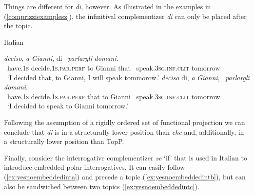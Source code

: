 \noindent Things are different for \textit{di}, however. As illustrated in the examples in (\ref{comprizziexamplesz}), the infinitival complementizer \textit{di} can only be placed after the topic. 

\begin{exe}
\ex Italian \citep[205]{rizzi2013notes} \label{comprizziexamplesz}\begin{xlist} 
\ex {} {\textit{deciso},} {\textit{a}} {\textit{Gianni},} {di} {\textcolor{white}{*}\textit{parlargli}} {\textit{domani}.} \\
{\textcolor{white}{*}have.\textsc{1s}} {decide.\textsc{1s.par.perf}} {to} {Gianni} {that} {\textcolor{white}{*}speak.\textsc{3sg.inf}.\textsc{clit}} {tomorrow} \\
\trans \textcolor{white}{*}`I decided that, to Gianni, I will speak tommorow.' \label{ex:comprizziabz}
\ex {} {\textit{deciso}} {di,} {\textit{a}} {\textit{Gianni},} {\textcolor{white}{*}\textit{parlargli}} {\textit{domani}.} \\
{\textcolor{white}{*}have.\textsc{1s}} {decide.\textsc{1s.par.perf}} {that} {to} {Gianni} {\textcolor{white}{*}speak.\textsc{3sg.inf}.\textsc{clit}} {tomorrow} \\
\trans \textcolor{white}{*}`I decided to speak to Gianni tomorrow.' \label{ex:comprizziaz}
\end{xlist}
\end{exe}

\noindent Following the assumption of a rigidly ordered set of functional projection we can conclude that \textit{di} is in a structurally lower position than \textit{che} and, additionally, in a structurally lower position than TopP.

Finally, consider the interrogative complementizer \textit{se} `if' that is used in Italian to introduce embedded polar interrogatives. It can easily follow (\ref{ex:yesnoembeddedinta}) and precede a topic (\ref{ex:yesnoembeddedintb}), but can also be sandwiched between two topics (\ref{ex:yesnoembeddedintc}).

